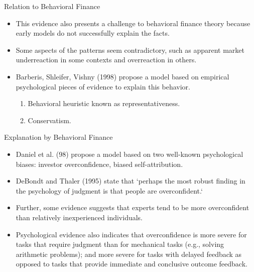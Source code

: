 \documentclass{beamer}
\begin{document}
\begin{frame}{Relation to Behavioral Finance}
    \begin{itemize}
        \item This evidence also presents a challenge to behavioral ﬁnance theory because early models do not successfully explain the facts.
        \item Some aspects of the patterns seem contradictory, such as apparent market underreaction in some contexts and overreaction in others.
        \item Barberis, Shleifer, Vishny (1998) propose a model based on empirical psychological pieces of evidence to explain this behavior.
              \begin{enumerate}
                  \item Behavioral heuristic known as representativeness.
                  \item Conservatism.
              \end{enumerate}
    \end{itemize}
\end{frame}

\begin{frame}{Explanation by Behavioral Finance}
    \begin{itemize}
        \item Daniel et al. (98) propose a model based on two well-known psychological biases: investor overconfidence, biased self-attribution.
        \item DeBondt and Thaler (1995) state that `perhaps the most robust finding in the psychology of judgment is that people are overconfident.`
        \item Further, some evidence suggests that experts tend to be more overconfident than relatively inexperienced individuals.
        \item Psychological evidence also indicates that overconfidence is more severe for tasks that require judgment than for mechanical tasks (e.g., solving arithmetic problems); and more severe for tasks with delayed feedback as opposed to tasks that provide immediate and conclusive outcome feedback.
    \end{itemize}
\end{frame}
\end{document}
